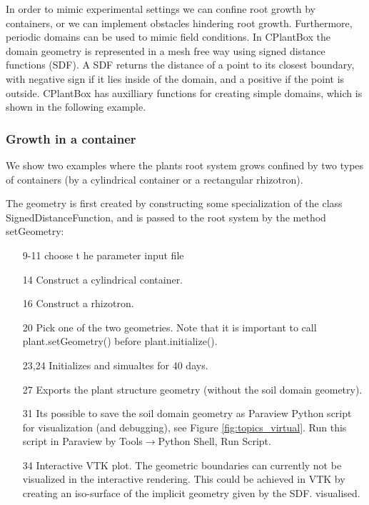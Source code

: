 In order to mimic experimental settings we can confine root growth by containers, or we can implement obstacles hindering root growth. Furthermore, periodic domains can be used to mimic field conditions. In CPlantBox the domain geometry is represented in a mesh free way using signed distance functions (SDF). A SDF returns the distance of a point to its closest boundary, with negative sign if it lies inside of the domain, and a positive if the point is outside. CPlantBox has auxilliary functions for creating simple domains, which is shown in the following example.

\subsubsection*{Growth in a container}

We show two examples where the plants root system grows confined by two types of containers 
(by a cylindrical container or a rectangular rhizotron). 



The geometry is first created by constructing some specialization of the class SignedDistanceFunction, 
and is passed to the root system by the method setGeometry: 
\begin{itemize}
 \item[9-11] choose t
 he parameter input file
 \item[14] Construct a cylindrical container. 
 \item[16] Construct a rhizotron.
 \item[20] Pick one of the two geometries. Note that it is important to call plant.setGeometry() before plant.initialize().
 \item[23,24] Initializes and simualtes for 40 days.
 \item[27] Exports the plant structure geometry (without the soil domain geometry).
 \item[31] Its possible to save the soil domain geometry as Paraview Python script for visualization (and debugging), see Figure \ref{fig:topics_virtual}. Run this script in Paraview by Tools$\rightarrow$Python Shell, Run Script. 
\item[34] Interactive VTK plot. The geometric boundaries can currently not be visualized in the interactive rendering. This could be achieved in VTK by creating an iso-surface of the implicit geometry given by the SDF. visualised. 
\end{itemize}

